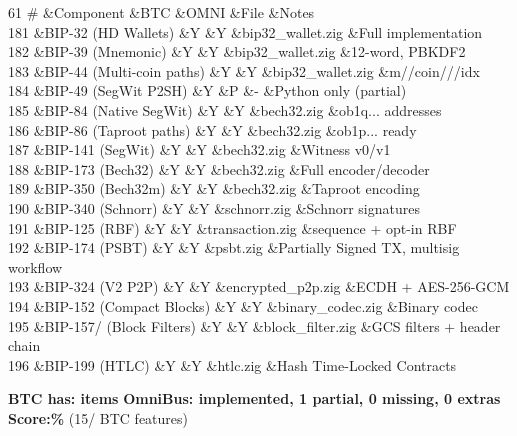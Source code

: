 \begin{DoxyTable}{6}{}{}{1}
\#  &Component  &BTC  &OMNI  &File  &Notes  \\
181  &BIP-\/32 (HD Wallets)  &Y  &Y  &bip32\+\_\+wallet.\+zig  &Full implementation  \\
182  &BIP-\/39 (Mnemonic)  &Y  &Y  &bip32\+\_\+wallet.\+zig  &12-\/word, PBKDF2  \\
183  &BIP-\/44 (Multi-\/coin paths)  &Y  &Y  &bip32\+\_\+wallet.\+zig  &m/\textquotesingle{}/\+coin\textquotesingle{}/\textquotesingle{}//\+idx  \\
184  &BIP-\/49 (Seg\+Wit P2\+SH)  &Y  &P  &-\/  &Python only (partial)  \\
185  &BIP-\/84 (Native Seg\+Wit)  &Y  &Y  &bech32.\+zig  &ob1q... addresses  \\
186  &BIP-\/86 (Taproot paths)  &Y  &Y  &bech32.\+zig  &ob1p... ready  \\
187  &BIP-\/141 (Seg\+Wit)  &Y  &Y  &bech32.\+zig  &Witness v0/\+v1  \\
188  &BIP-\/173 (Bech32)  &Y  &Y  &bech32.\+zig  &Full encoder/\+decoder  \\
189  &BIP-\/350 (Bech32m)  &Y  &Y  &bech32.\+zig  &Taproot encoding  \\
190  &BIP-\/340 (Schnorr)  &Y  &Y  &schnorr.\+zig  &Schnorr signatures  \\
191  &BIP-\/125 (RBF)  &Y  &Y  &transaction.\+zig  &sequence + opt-\/in RBF  \\
192  &BIP-\/174 (PSBT)  &Y  &Y  &psbt.\+zig  &Partially Signed TX, multisig workflow  \\
193  &BIP-\/324 (V2 P2P)  &Y  &Y  &encrypted\+\_\+p2p.\+zig  &ECDH + AES-\/256-\/\+GCM  \\
194  &BIP-\/152 (Compact Blocks)  &Y  &Y  &binary\+\_\+codec.\+zig  &Binary codec  \\
195  &BIP-\/157/ (Block Filters)  &Y  &Y  &block\+\_\+filter.\+zig  &GCS filters + header chain  \\
196  &BIP-\/199 (HTLC)  &Y  &Y  &htlc.\+zig  &Hash Time-\/\+Locked Contracts  \\
\end{DoxyTable}




{\bfseries{BTC has: items}} {\bfseries{Omni\+Bus: implemented, 1 partial, 0 missing, 0 extras}} {\bfseries{Score:\%}} (15/ BTC features) 